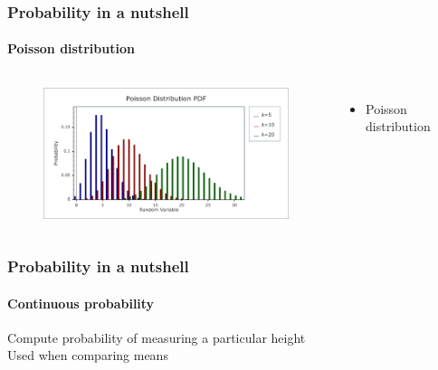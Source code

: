 \documentclass[aspectratio=43]{beamer}
\begin{document}
\begin{frame}
	
	\frametitle{Probability in a nutshell}
	\framesubtitle{Poisson distribution}
	
	\footnotesize
	
	\begin{columns}	
		
		
		\begin{figure}
			\includegraphics[width = 6 cm]{plots/part1/poisson.png}
		\end{figure}
		
		
		\begin{itemize}
			\item Poisson distribution
		\end{itemize}
		
	\end{columns}

\end{frame}

\begin{frame}
	
	\frametitle{Probability in a nutshell}
	\framesubtitle{Continuous probability}

	\footnotesize

	Compute probability of measuring a particular height \\
	Used when comparing means

\end{frame}
\end{document}
